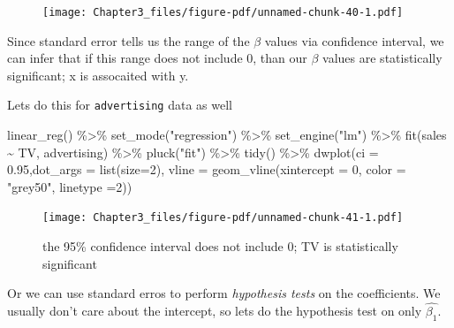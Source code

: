 \documentclass[
  letterpaper,
  DIV=11,
  numbers=noendperiod]{scrreprt}
\newenvironment{Shaded}{\begin{snugshade}}{\end{snugshade}}
\newcommand{\AttributeTok}[1]{\textcolor[rgb]{0.65,0.35,0.00}{#1}}
\newcommand{\DecValTok}[1]{\textcolor[rgb]{0.47,0.16,0.63}{#1}}
\newcommand{\FloatTok}[1]{\textcolor[rgb]{0.65,0.35,0.00}{#1}}
\newcommand{\FunctionTok}[1]{\textcolor[rgb]{0.02,0.16,0.49}{#1}}
\newcommand{\NormalTok}[1]{\textcolor[rgb]{0.33,0.33,0.33}{#1}}
\newcommand{\SpecialCharTok}[1]{\textcolor[rgb]{0.00,0.46,0.62}{#1}}
\newcommand{\StringTok}[1]{\textcolor[rgb]{0.00,0.50,0.00}{#1}}
\begin{document}
\begin{figure}[H]

{\centering \texttt{[image: Chapter3\_files/figure-pdf/unnamed-chunk-40-1.pdf]}

}

\end{figure}

Since standard error tells us the range of the \(\beta\) values via
confidence interval, we can infer that if this range does not include 0,
than our \(\beta\) values are statistically significant; x is assocaited
with y.

Lets do this for \texttt{advertising} data as well

\begin{Shaded}
\begin{Highlighting}[]
\FunctionTok{linear\_reg}\NormalTok{() }\SpecialCharTok{\%\textgreater{}\%} 
  \FunctionTok{set\_mode}\NormalTok{(}\StringTok{"regression"}\NormalTok{) }\SpecialCharTok{\%\textgreater{}\%} 
  \FunctionTok{set\_engine}\NormalTok{(}\StringTok{"lm"}\NormalTok{) }\SpecialCharTok{\%\textgreater{}\%} 
  \FunctionTok{fit}\NormalTok{(sales }\SpecialCharTok{\textasciitilde{}}\NormalTok{ TV, advertising) }\SpecialCharTok{\%\textgreater{}\%} 
  \FunctionTok{pluck}\NormalTok{(}\StringTok{"fit"}\NormalTok{) }\SpecialCharTok{\%\textgreater{}\%} 
  \FunctionTok{tidy}\NormalTok{() }\SpecialCharTok{\%\textgreater{}\%} 
  \FunctionTok{dwplot}\NormalTok{(}\AttributeTok{ci =} \FloatTok{0.95}\NormalTok{,}\AttributeTok{dot\_args =} \FunctionTok{list}\NormalTok{(}\AttributeTok{size=}\DecValTok{2}\NormalTok{), }\AttributeTok{vline =} \FunctionTok{geom\_vline}\NormalTok{(}\AttributeTok{xintercept =} \DecValTok{0}\NormalTok{, }\AttributeTok{color =} \StringTok{"grey50"}\NormalTok{, }\AttributeTok{linetype =}\DecValTok{2}\NormalTok{))}
\end{Highlighting}
\end{Shaded}

\begin{figure}[H]

{\centering \texttt{[image: Chapter3\_files/figure-pdf/unnamed-chunk-41-1.pdf]}

}

\caption{the 95\% confidence interval does not include 0; TV is
statistically significant}

\end{figure}

Or we can use standard erros to perform \emph{hypothesis tests} on the
coefficients. We usually don't care about the intercept, so lets do the
hypothesis test on only \(\hat{\beta_1}\).
\end{document}
